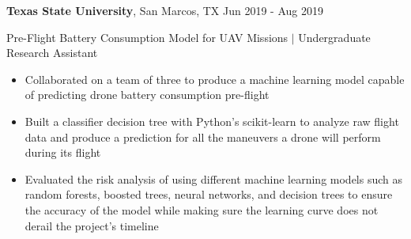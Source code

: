 \documentclass[10pt]{article}
\begin{document}
\textbf{Texas State University}, San Marcos, TX \hfill Jun 2019 - Aug 2019\par
Pre-Flight Battery Consumption Model for UAV Missions $\vert$ Undergraduate Research Assistant
\begin{itemize}
	\item Collaborated on a team of three to produce a machine learning model capable of predicting drone battery consumption pre-flight
	\item Built a classifier decision tree with Python's scikit-learn to analyze raw flight data and produce a prediction for all the maneuvers a drone will perform during its flight
	\item Evaluated the risk analysis of using different machine learning models such as random forests, boosted trees, neural networks, and decision trees to ensure the accuracy of the model while making sure the learning curve does not derail the project's timeline
\end{itemize}

%
\end{document}
